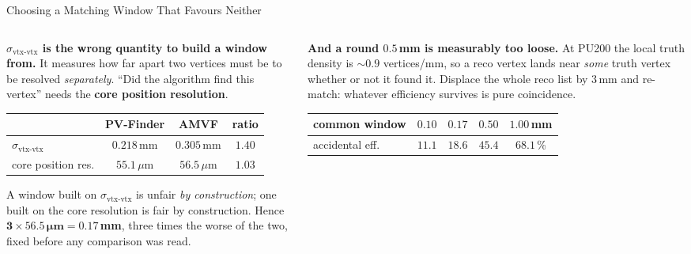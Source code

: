 \documentclass[xcolor=table,aspectratio=169]{beamer}
\begin{document}
\begin{frame}{Choosing a Matching Window That Favours Neither}
    \begin{columns}[t]
        \begin{column}{0.5\linewidth}
            \small
            \textbf{$\sigma_{\text{vtx-vtx}}$ is the wrong quantity to build a window from.}
            It measures how far apart two vertices must be to be resolved
            \emph{separately}. ``Did the algorithm find this vertex'' needs the
            \textbf{core position resolution}.
            \vspace{0.3em}
            \centering
            \footnotesize
            \begin{tabular}{lccc}
                \toprule
                & PV-Finder & AMVF & ratio \\
                \midrule
                $\sigma_{\text{vtx-vtx}}$ & $0.218$\,mm & $0.305$\,mm & \textcolor{myred}{$\mathbf{1.40}$} \\
                core position res. & $55.1\,\mu$m & $56.5\,\mu$m & \textcolor{mygreen!70!black}{$\mathbf{1.03}$} \\
                \bottomrule
            \end{tabular}
            \vspace{0.4em}
            \raggedright

            A window built on $\sigma_{\text{vtx-vtx}}$ is unfair \emph{by
            construction}; one built on the core resolution is fair by construction.
            Hence \(\mathbf{3\times 56.5\,\mu m = 0.17}\)\,\textbf{mm}, three times the
            worse of the two, fixed before any comparison was read.
        \end{column}
        \begin{column}{0.5\linewidth}
            \small
            \textbf{And a round $0.5$\,mm is measurably too loose.} At PU200 the local
            truth density is ${\sim}0.9$ vertices/mm, so a reco vertex lands near
            \emph{some} truth vertex whether or not it found it. Displace the whole
            reco list by $3$\,mm and re-match: whatever efficiency survives is pure
            coincidence.
            \vspace{0.3em}
            \centering
            \footnotesize
            \begin{tabular}{lcccc}
                \toprule
                common window & $0.10$ & $\mathbf{0.17}$ & $\mathbf{0.50}$ & $1.00$\,mm \\
                \midrule
                accidental eff. & $11.1$ & $\mathbf{18.6}$ & $\mathbf{45.4}$ & $68.1$\,\% \\
                \bottomrule
            \end{tabular}
            \vspace{0.4em}
            \raggedright


\end{column}
\end{columns}
\end{frame}
\end{document}
